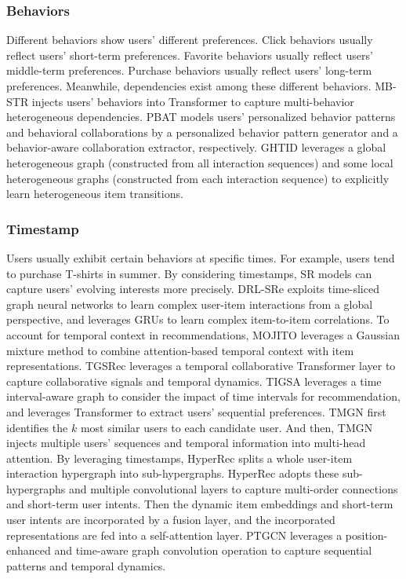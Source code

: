 \documentclass[review]{fcs}
\begin{document}
	\subsubsection{Behaviors}
	Different behaviors show users' different preferences. Click behaviors usually reflect users' short-term preferences. Favorite behaviors usually reflect users' middle-term preferences. Purchase behaviors usually reflect users' long-term preferences. Meanwhile, dependencies exist among these different behaviors. MB-STR \cite{MB-STR} injects users’ behaviors into Transformer to capture multi-behavior heterogeneous dependencies. PBAT \cite{PBAT} models users’ personalized behavior patterns and behavioral collaborations by a personalized behavior pattern generator and a behavior-aware collaboration extractor, respectively. GHTID \cite{GHTID} leverages a global heterogeneous graph (constructed from all interaction sequences) and some local heterogeneous graphs (constructed from each interaction sequence) to explicitly learn heterogeneous item transitions.
	\subsubsection{Timestamp}
	Users usually exhibit certain behaviors at specific times. For example, users tend to purchase T-shirts in summer. By considering timestamps, SR models can capture users' evolving interests more precisely. DRL-SRe \cite{DRL-SRe} exploits time-sliced graph neural networks to learn complex user-item interactions from a global perspective, and leverages GRUs to learn complex item-to-item correlations. To account for temporal context in recommendations, MOJITO \cite{MOJITO} leverages a Gaussian mixture method to combine attention-based temporal context with item representations. TGSRec \cite{TGSRec} leverages a temporal collaborative Transformer layer to capture collaborative signals and temporal dynamics. TIGSA \cite{TIGSA} leverages a time interval-aware graph to consider the impact of time intervals for recommendation, and leverages Transformer to extract users' sequential preferences. TMGN \cite{TMGN} first identifies the $k$ most similar users to each candidate user. And then, TMGN \cite{TMGN} injects multiple users' sequences and temporal information into multi-head attention. By leveraging timestamps, HyperRec \cite{HyperRec} splits a whole user-item interaction hypergraph into sub-hypergraphs. HyperRec \cite{HyperRec} adopts these sub-hypergraphs and multiple convolutional layers to capture multi-order connections and short-term user intents. Then the dynamic item embeddings and short-term user intents are incorporated by a fusion layer, and the incorporated representations are fed into a self-attention layer. PTGCN \cite{PTGCN} leverages a position-enhanced and time-aware graph convolution operation to capture sequential patterns and temporal dynamics.
\end{document}
